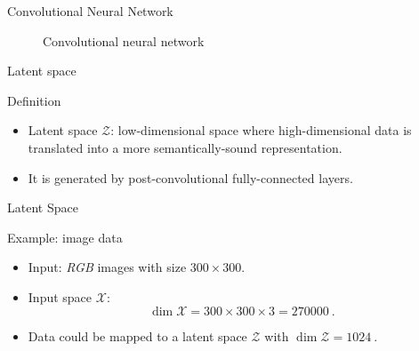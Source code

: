 \begin{frame}{Convolutional Neural Network}
\begin{figure}
{
        }
        \caption*{Convolutional neural network}
    \end{figure}
\end{frame}

\begin{frame}{Latent space}
    \begin{definitionblock}{Definition}
        \centering
        \begin{itemize}
            \item<1-> Latent space $\mathcal{Z}$: low-dimensional space where high-dimensional data is translated into a more semantically-sound representation.
            \item <2-> It is generated by post-convolutional fully-connected layers.
        \end{itemize}
    \end{definitionblock}
\end{frame}

\begin{frame}{Latent Space}
    \begin{normalblock}{Example: image data}
        \begin{itemize}
            \item <1-> Input: \emph{RGB} images with size $300 \times 300$.
            \item <2-> Input space $\mathcal{X}$:
            \[
                \dim{\mathcal{X}} = 300\times300\times3 = \SI{270000}{}.
            \]
            \item <3-> Data could be mapped to a latent space $\mathcal{Z}$ with $\dim \mathcal{Z}= \SI{1024}{}$.
        \end{itemize}
    \end{normalblock}
\end{frame}

